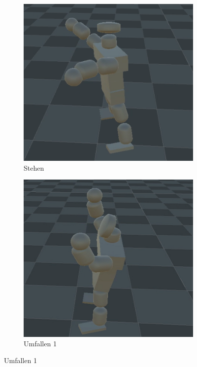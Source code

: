\begin{figure}
\begin{subfigure}[b]{0.18\textwidth}
		\includegraphics[width=\textwidth]{resources/img/2BAufstehen/Fall2_stehen}
		\caption{Stehen}
	\end{subfigure}
	\hfill
	\begin{subfigure}[b]{0.18\textwidth}
		\centering
		\includegraphics[width=\textwidth]{resources/img/2BAufstehen/Fall2_uber}
		\caption{Umfallen 1}

\end{subfigure}
\end{figure}

